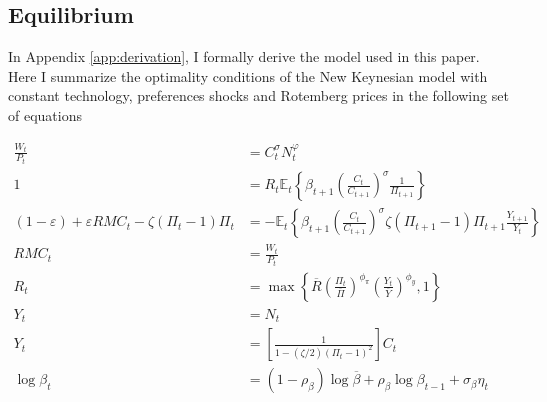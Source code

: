 \documentclass[12pt]{article}
\numberwithin{equation}{section}
\begin{document}
\subsection{Equilibrium}\label{sec:model_equilibrium}

In Appendix \ref{app:derivation}, I formally derive the model used in this paper. Here I summarize the optimality conditions of the New Keynesian model with constant technology, preferences shocks and Rotemberg prices in the following set of equations

\begin{align}
	\frac{W_t}{P_t}&=C_t^{\sigma}N_t^{\varphi}\label{eq:m_intra}\\
	1&=R_t\mathbb{E}_t\left\{\beta_{t+1}\left(\frac{C_t}{C_{t+1}}\right)^{\sigma}\frac{1}{\Pi_{t+1}}\right\}\label{eq:m_euler}\\
	(1-\varepsilon)+\varepsilon RMC_t-\zeta(\Pi_t-1)\Pi_t&=-\mathbb{E}_t\left\{\beta_{t+1}\left(\frac{C_t}{C_{t+1}}\right)^{\sigma}\zeta(\Pi_{t+1}-1)\Pi_{t+1}\frac{Y_{t+1}}{Y_t}\right\}\label{eq:m_pricing}\\
	RMC_t&=\frac{W_t}{P_t}\label{eq:m_rmc}\\
	R_t&=\max\left\{\overline R\left(\frac{\Pi_t}{\overline\Pi}\right)^{\phi_{\pi}}\left(\frac{Y_t}{\overline{Y}}\right)^{\phi_{y}},1\right\}\label{eq:m_taylor}\\
	Y_t&=N_t\label{eq:m_product}\\
	Y_t&=\left[\frac{1}{1-(\zeta/2)(\Pi_t-1)^2}\right]C_t\label{eq:m_aggregate}\\
	\log \beta_t&=(1-\rho_{\beta})\log\overline\beta+\rho_{\beta}\log \beta_{t-1}+\sigma_{\beta}\eta_t\label{eq:m_ar1_b}
\end{align}
\end{document}
